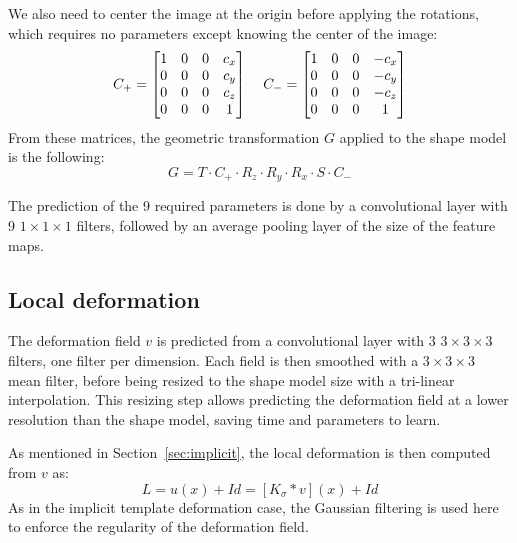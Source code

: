 We also need to center the image at the origin before applying the rotations, which requires no parameters except knowing the center of the image:
\begin{equation*}
    C_+ = 
    \begin{bmatrix}
        1 & 0 & 0 & c_x \\
        0 & 0 & 0 & c_y \\
        0 & 0 & 0 & c_z \\ 
        0 & 0 & 0 & 1
    \end{bmatrix}
    \mkern20mu
    C_- = 
    \begin{bmatrix}
        1 & 0 & 0 & -c_x \\
        0 & 0 & 0 & -c_y \\
        0 & 0 & 0 & -c_z \\ 
        0 & 0 & 0 & 1
    \end{bmatrix}
\end{equation*}
From these matrices, the geometric transformation $G$ applied to the shape model is the following:
\begin{equation}
    G = T \cdot C_+ \cdot R_z \cdot R_y \cdot R_x \cdot S \cdot C_-
\end{equation}

The prediction of the 9 required parameters is done by a convolutional layer with 9 $1 \times 1 \times 1$ filters, followed by an average pooling layer of the size of the feature maps. 

\subsection{Local deformation}
\label{ssec:seg_local}

The deformation field $v$ is predicted from a convolutional layer with 3 $3 \times 3 \times 3$ filters, one filter per dimension. Each field is then smoothed with a $3 \times 3 \times 3$ mean filter, before being resized to the shape model size with a tri-linear interpolation. This resizing step allows predicting the deformation field at a lower resolution than the shape model, saving time and parameters to learn.

As mentioned in Section~\ref{sec:implicit}, the local deformation is then computed from $v$ as:
\begin{equation}
    L = u(x) + Id = [K_{\sigma} * v](x) + Id
\end{equation}
As in the implicit template deformation case, the Gaussian filtering is used here to enforce the regularity of the deformation field.

